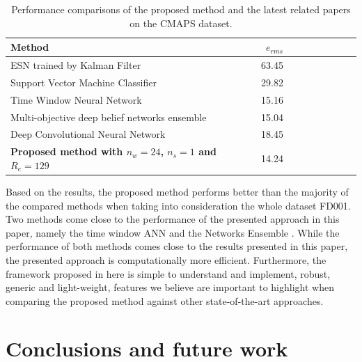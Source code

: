 \documentclass{article}
\begin{document}
\begin{table}[!htb]
\centering
\begin{tabular}{l | r r r r | r r r r}
	\hline	
	Method & $e_{rms}$ \\
  	\hline
  	ESN trained by Kalman Filter \cite{Peng2012} & 63.45\\
  	Support Vector Machine Classifier \cite{Louen2013} & 29.82\\
  	Time Window Neural Network \cite{Lim2016} & 15.16\\
  	Multi-objective deep belief networks ensemble \cite{Zhang2016} & 15.04\\
  	Deep Convolutional Neural Network \cite{Babu2016} & 18.45\\
  	\textbf{Proposed method with $n_w = 24$, $n_s=1$ and $R_e = 129$} & 14.24\\
  	\hline
\end{tabular}
\caption{Performance comparisons of the proposed method and the latest related papers on the CMAPS dataset.}
\label{table:results_comparison}
\end{table}

Based on the results, the proposed method performs better than the majority of the compared methods when taking into consideration the whole dataset FD001. Two methods come close to the performance of the presented approach in this paper, namely the time window ANN \cite{Lim2016} and the Networks Ensemble \cite{Zhang2016}. While the performance of both methods comes close to the results presented in this paper, the presented approach is computationally more efficient. Furthermore, the framework proposed in here is simple to understand and implement, robust, generic and light-weight, features we believe are important to highlight when comparing the proposed method against other state-of-the-art approaches.


\section{Conclusions and future work}
\label{sec:conclusions}
\end{document}
